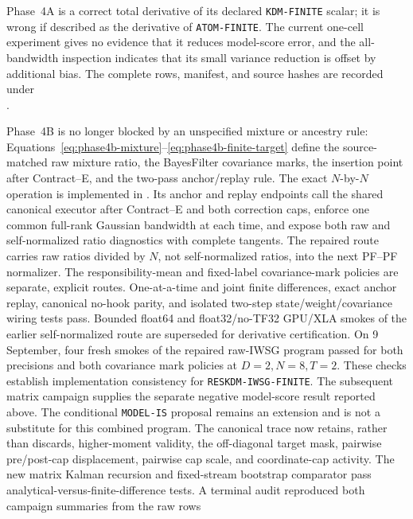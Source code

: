 \documentclass[11pt]{article}
\begin{document}
Phase~4A is a correct total derivative of its declared
\texttt{KDM-FINITE} scalar; it is wrong if described as the derivative of
\texttt{ATOM-FINITE}.  The current one-cell experiment gives no evidence that
it reduces model-score error, and the all-bandwidth inspection indicates that
its small variance reduction is offset by additional bias.  The complete
rows, manifest, and source hashes are recorded under
\\
.

Phase~4B is no longer blocked by an unspecified mixture or ancestry rule:
Equations~\eqref{eq:phase4b-mixture}--\eqref{eq:phase4b-finite-target} define
the source-matched raw mixture ratio, the BayesFilter covariance marks,
the insertion point after Contract--E, and the two-pass anchor/replay rule.
The exact $N$-by-$N$ operation is implemented in
.  Its anchor and
replay endpoints call the shared canonical executor after Contract--E and both
correction caps, enforce one common full-rank Gaussian bandwidth at each time,
and expose both raw and self-normalized ratio diagnostics with complete
tangents.  The repaired route carries raw ratios divided by $N$, not
self-normalized ratios, into the next PF--PF normalizer.  The
responsibility-mean and fixed-label covariance-mark policies are separate,
explicit routes.  One-at-a-time and joint finite
differences, exact anchor replay, canonical no-hook parity, and isolated
two-step state/weight/covariance wiring tests pass.  Bounded float64 and
float32/no-TF32 GPU/XLA smokes of the earlier self-normalized route are
superseded for derivative certification.  On 9 September, four fresh smokes
of the repaired raw-IWSG program passed for both precisions and both covariance
mark policies at $D=2,N=8,T=2$.  These checks establish implementation
consistency for \texttt{RESKDM-IWSG-FINITE}.  The subsequent matrix campaign
supplies the separate negative model-score result reported above.  The
conditional \texttt{MODEL-IS} proposal
remains an extension and is not a substitute for this combined program.
The canonical trace now retains, rather than discards, higher-moment validity,
the off-diagonal target mask, pairwise pre/post-cap displacement, pairwise cap
scale, and coordinate-cap activity.  The new matrix Kalman recursion and
fixed-stream bootstrap comparator pass analytical-versus-finite-difference
tests.  A terminal audit reproduced both campaign summaries from the raw rows
\end{document}
